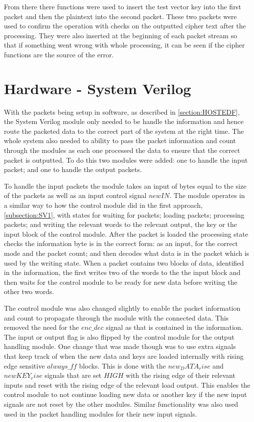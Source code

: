 \documentclass[12pt,twoside,a4paper]{report}
\begin{document}
	From there there functions were used to insert the test vector key into the first packet and then the plaintext into the second packet. These two packets were used to confirm the operation with checks on the outputted cipher text after the processing. They were also inserted at the beginning of each packet stream so that if something went wrong with whole processing, it can be seen if the cipher functions are the source of the error.
    
	\section{Hardware - System Verilog}
	\label{section:SVF}
		
	With the packets being setup in software, as described in \autoref{section:HOSTEDF}, the System Verilog module only needed to be handle the information and hence route the packeted data to the correct part of the system at the right time. The whole system also needed to ability to pass the packet information and count through the modules as each one processed the data to ensure that the correct packet is outputted. To do this two modules were added: one to handle the input packet; and one to handle the output packets.
	
	To handle the input packets the module takes an input of bytes equal to the size of the packets as well as an input control signal $newIN$. The module operates in a similar way to how the control module did in the first approach, \autoref{subsection:SV1}, with states for waiting for packets; loading packets; processing packets; and writing the relevant words to the relevant output, the key or the input block of the control module. After the packet is loaded the processing state checks the information byte is in the correct form: as an input, for the correct mode and the packet count; and then decodes what data is in the packet which is used by the writing state. When a packet contains two blocks of data, identified in the information, the first writes two of the words to the the input block and then waits for the control module to be ready for new data before writing the other two words.
	
	The control module was also changed slightly to enable the packet information and count to propagate through the module with the connected data. This removed the need for the $enc\_dec$ signal as that is contained in the information. The input or output flag is also flipped by the control module for the output handling module. One change that was made though was to use extra signals that keep track of when the new data and keys are loaded internally with rising edge sensitive $always\_ff$ blocks. This is done with the $new_DATA_rise$ and $newKEY_rise$ signals that are set $HIGH$ with the rising edge of their relevant inputs and reset with the rising edge of the relevant load output. This enables the control module to not continue loading new data or another key if the new input signals are not reset by the other modules. Similar functionality was also used used in the packet handling modules for their new input signals.
\end{document}
